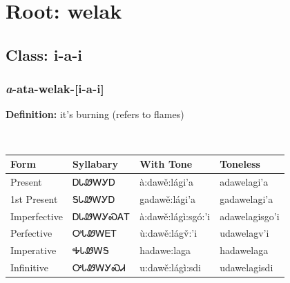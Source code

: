\needspace{4in}
\section*{Root: welak}
\nopagebreak
{}
\needspace{3in}
\subsection*{Class: i-a-i}
\nopagebreak
\needspace{2in}
\subsubsection*{\textit{a}{-}ata{-}\textbf{welak}{-}[i-a-i]}
\nopagebreak
\textbf{Definition: } it{\textquoteright}s burning (refers to flames)
\\[0.5em]
\begin{tabularx}{\textwidth}{l X X X}%
\toprule%
\textbf{Form}&\textbf{Syllabary}&\textbf{With Tone}&\textbf{Toneless}\\%
\midrule%
Present&ᎠᏓᏪᎳᎩᎠ&à:dawě:lági’a&adawelagi’a\\%
1st Present&ᎦᏓᏪᎳᎩᎠ&gadawě:lági’a&gadawelagi’a\\%
Imperfective&ᎠᏓᏪᎳᎩᏍᎪᎢ&à:dawě:lágì:sgó:’i&adawelagisgo’i\\%
Perfective&ᎤᏓᏪᎳᎬᎢ&ù:dawě:lágv̌:’i&udawelagv’i\\%
Imperative&ᎭᏓᏪᎳᎦ&hadawe:laga&hadawelaga\\%
Infinitive&ᎤᏓᏪᎳᎩᏍᏗ&u:dawě:lágì:sdi&udawelagisdi\\%
\bottomrule%
\end{tabularx}
\\[1em]